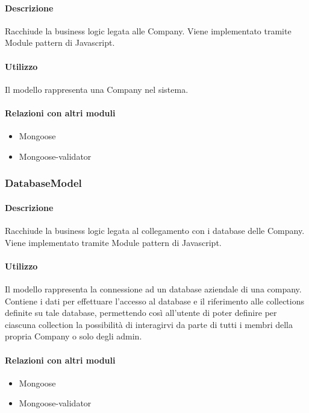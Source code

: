\paragraph*{Descrizione}

Racchiude la business logic legata alle Company. Viene implementato tramite Module pattern di Javascript. 

\paragraph*{Utilizzo}
Il modello rappresenta una Company nel sistema.

\paragraph*{Relazioni con altri moduli}
\begin{itemize}
\item Mongoose
\item Mongoose-validator
\end{itemize}

\subsubsection{DatabaseModel}
\paragraph*{Descrizione}

Racchiude la business logic legata al collegamento con i database delle Company. Viene implementato tramite Module pattern di Javascript. 

\paragraph*{Utilizzo}
Il modello rappresenta la connessione ad un database aziendale di una company. Contiene i dati per effettuare l'accesso al database e il riferimento alle collections definite su tale database, permettendo così all'utente di poter definire per ciascuna collection la possibilità di interagirvi da parte di tutti i membri della propria Company o solo degli admin.

\paragraph*{Relazioni con altri moduli}
\begin{itemize}
\item Mongoose
\item Mongoose-validator
\end{itemize}

